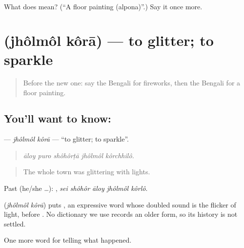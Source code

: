 \begin{tcolorbox}[breakable,colback=teal!4,colframe=teal!35!black,title={Before you move on}]
What does  mean? (\textquotedblleft{}A floor painting (alpona)\textquotedblright{}.) Say it once more.
\end{tcolorbox}
\section[\texorpdfstring{\bn{ঝলমল} \bn{করা} (jhôlmôl kôrā)}{ঝলমল করা (jhôlmôl kôrā)}]{  (jhôlmôl kôrā) — to glitter; to sparkle}

\label{lesson:BN-C305-jholmol-kora}



\begin{quote}
Before the new one: say the Bengali for fireworks, then the Bengali for a floor painting.
\end{quote}

\subsection*{You'll want to know:  }
\textbf{ } — \emph{jhôlmôl kôrā} — \textquotedblleft{}to glitter; to sparkle\textquotedblright{}.

\begin{quote}
    
\end{quote}

\begin{quote}
\emph{āloy puro shôhôrṭā jhôlmôl kôrchhilô.}
\end{quote}

\begin{quote}
The whole town was glittering with lights.
\end{quote}

Past (he/she …):     , \emph{sei shôhôr āloy jhôlmôl kôrlô}.

\begin{cousinweb}
\textbf{ } (\emph{jhôlmôl kôrā}) puts , an expressive word whose doubled sound is the flicker of light, before . No dictionary we use records an older form, so its history is not settled.
\end{cousinweb}

\begin{grammarlens}[title={What you've built}]
One more word for telling what happened.
\end{grammarlens}

